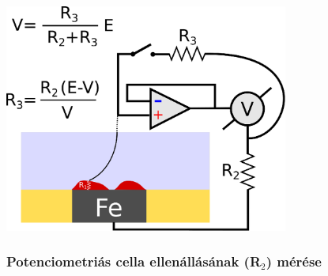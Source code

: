 \documentclass{beamer}
\begin{document}
\begin{frame}
	\centering
	\includegraphics[width=0.7\textwidth]{whisker2.eps}
	\frametitle{Potenciometriás cella ellenállásának (R$_2$) mérése}
	
\end{frame}
\end{document}
